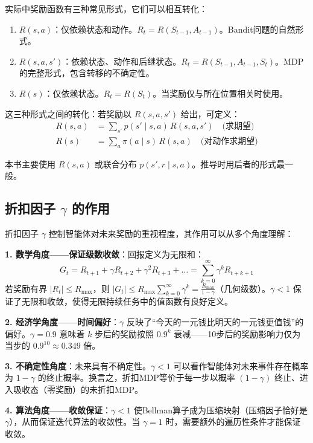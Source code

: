实际中奖励函数有三种常见形式，它们可以相互转化：

\begin{enumerate}
    \item \textbf{$R(s, a)$}：仅依赖状态和动作。$R_t = R(S_{t-1}, A_{t-1})$。Bandit问题的自然形式。
    \item \textbf{$R(s, a, s')$}：依赖状态、动作和后继状态。$R_t = R(S_{t-1}, A_{t-1}, S_t)$。MDP的完整形式，包含转移的不确定性。
    \item \textbf{$R(s)$}：仅依赖状态。$R_t = R(S_t)$。当奖励仅与所在位置相关时使用。
\end{enumerate}

这三种形式之间的转化：若奖励以 $R(s, a, s')$ 给出，可定义：
\begin{align*}
R(s, a) &= \sum_{s'} p(s' \mid s, a) \, R(s, a, s') \quad \text{(求期望)} \\
R(s) &= \sum_a \pi(a \mid s) \, R(s, a) \quad \text{(对动作求期望)}
\end{align*}

本书主要使用 $R(s, a)$ 或联合分布 $p(s', r \mid s, a)$。推导时用后者的形式最一般。

\subsection{折扣因子 $\gamma$ 的作用}

折扣因子 $\gamma$ 控制智能体对未来奖励的重视程度，其作用可以从多个角度理解：

\textbf{1. 数学角度——保证级数收敛}：回报定义为无限和：
\[
G_t = R_{t+1} + \gamma R_{t+2} + \gamma^2 R_{t+3} + \dots = \sum_{k=0}^{\infty} \gamma^k R_{t+k+1}
\]
若奖励有界 $|R_t| \le R_{\max}$，则 $|G_t| \le R_{\max} \sum_{k=0}^{\infty} \gamma^k = \frac{R_{\max}}{1 - \gamma}$（几何级数）。$\gamma < 1$ 保证了无限和收敛，使得无限持续任务中的值函数有良好定义。

\textbf{2. 经济学角度——时间偏好}：$\gamma$ 反映了``今天的一元钱比明天的一元钱更值钱''的偏好。$\gamma = 0.9$ 意味着 $k$ 步后的奖励按照 $0.9^k$ 衰减——10步后的奖励影响力仅为当步的 $0.9^{10} \approx 0.349$ 倍。

\textbf{3. 不确定性角度}：未来具有不确定性。$\gamma < 1$ 可以看作智能体对未来事件存在概率为 $1 - \gamma$ 的终止概率。换言之，折扣MDP等价于每一步以概率 $(1-\gamma)$ 终止、进入吸收态（零奖励）的未折扣MDP。

\textbf{4. 算法角度——收敛保证}：$\gamma < 1$ 使Bellman算子成为压缩映射（压缩因子恰好是 $\gamma$），从而保证迭代算法的收敛性。当 $\gamma = 1$ 时，需要额外的遍历性条件才能保证收敛。

